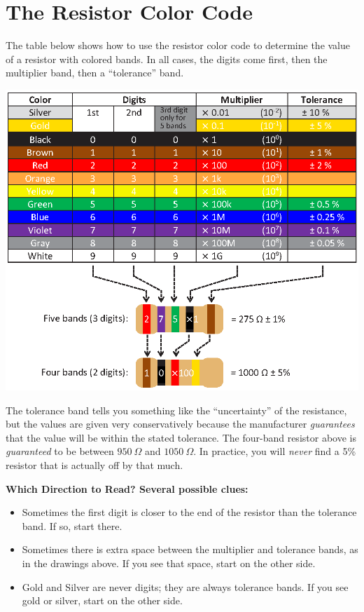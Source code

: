 \section{The Resistor Color Code}
\label{resistor_code}

The table below shows how to use the resistor color code to determine the value of a resistor with colored bands.  In all cases, the digits come first, then the multiplier band, then a ``tolerance'' band. 


{\centering \includegraphics{appendices/resistor_code/resistor_table.eps} \par}

The tolerance band tells you something like the ``uncertainty'' of the resistance, but the values are given very conservatively because the manufacturer \textit{guarantees} that the value will be within the stated tolerance.  The four-band resistor above is \textit{guaranteed} to be between $950~\Omega$ and $1050~\Omega$.  In practice, you will \textit{never} find a 5\% resistor that is actually off by that much.


\medskip
\textbf{Which Direction to Read? Several possible clues:}
\begin{itemize}[nosep]
\item Sometimes the first digit is closer to the end of the resistor than the tolerance band.  If so, start there.
\item Sometimes there is extra space between the multiplier and tolerance bands, as in the drawings above.  If you see that space, start on the other side.
\item Gold and Silver are never digits; they are always tolerance bands.  If you see gold or silver, start on the other side.
\end{itemize}

